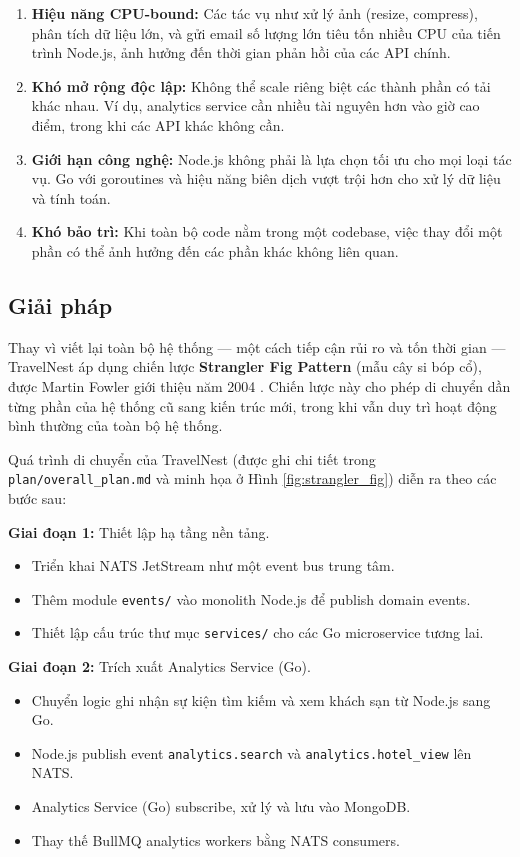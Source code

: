 \documentclass[13pt,a4paper,twoside]{report}
\begin{document}
\begin{enumerate}
  \item \textbf{Hiệu năng CPU-bound:} Các tác vụ như xử lý ảnh (resize, compress), phân tích dữ liệu lớn, và gửi email số lượng lớn tiêu tốn nhiều CPU của tiến trình Node.js, ảnh hưởng đến thời gian phản hồi của các API chính.
  \item \textbf{Khó mở rộng độc lập:} Không thể scale riêng biệt các thành phần có tải khác nhau. Ví dụ, analytics service cần nhiều tài nguyên hơn vào giờ cao điểm, trong khi các API khác không cần.
  \item \textbf{Giới hạn công nghệ:} Node.js không phải là lựa chọn tối ưu cho mọi loại tác vụ. Go với goroutines và hiệu năng biên dịch vượt trội hơn cho xử lý dữ liệu và tính toán.
  \item \textbf{Khó bảo trì:} Khi toàn bộ code nằm trong một codebase, việc thay đổi một phần có thể ảnh hưởng đến các phần khác không liên quan.
\end{enumerate}

\subsection{Giải pháp}

Thay vì viết lại toàn bộ hệ thống --- một cách tiếp cận rủi ro và tốn thời gian --- TravelNest áp dụng chiến lược \textbf{Strangler Fig Pattern} (mẫu cây si bóp cổ), được Martin Fowler giới thiệu năm 2004 \cite{fowler2004strangler}. Chiến lược này cho phép di chuyển dần từng phần của hệ thống cũ sang kiến trúc mới, trong khi vẫn duy trì hoạt động bình thường của toàn bộ hệ thống.

Quá trình di chuyển của TravelNest (được ghi chi tiết trong \texttt{plan/overall\_plan.md} và minh họa ở Hình \ref{fig:strangler_fig}) diễn ra theo các bước sau:

\textbf{Giai đoạn 1:} Thiết lập hạ tầng nền tảng.
\begin{itemize}
  \item Triển khai NATS JetStream như một event bus trung tâm.
  \item Thêm module \texttt{events/} vào monolith Node.js để publish domain events.
  \item Thiết lập cấu trúc thư mục \texttt{services/} cho các Go microservice tương lai.
\end{itemize}

\textbf{Giai đoạn 2:} Trích xuất Analytics Service (Go).
\begin{itemize}
  \item Chuyển logic ghi nhận sự kiện tìm kiếm và xem khách sạn từ Node.js sang Go.
  \item Node.js publish event \texttt{analytics.search} và \texttt{analytics.hotel\_view} lên NATS.
  \item Analytics Service (Go) subscribe, xử lý và lưu vào MongoDB.
  \item Thay thế BullMQ analytics workers bằng NATS consumers.
\end{itemize}
\end{document}
